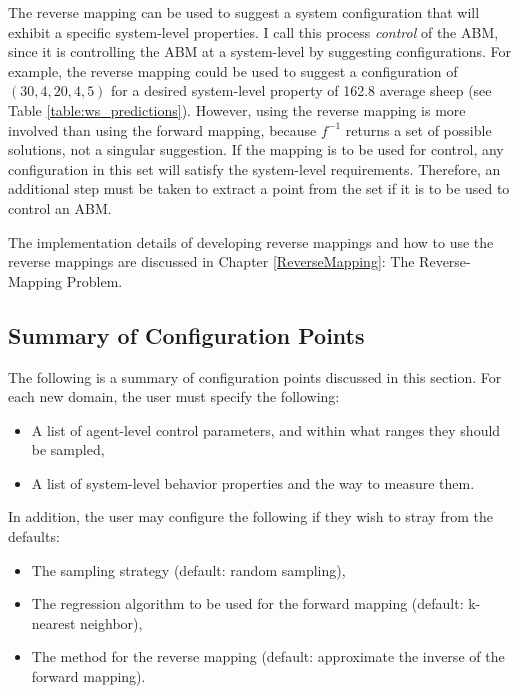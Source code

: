 The reverse mapping can be used to suggest a system configuration that will exhibit a specific system-level properties.
I call this process \textit{control} of the ABM, since it is controlling the ABM at a system-level by suggesting configurations.
For example, the reverse mapping could be used to suggest a configuration of $(30, 4, 20, 4, 5)$  for a desired system-level property of 162.8 average sheep (see Table \ref{table:ws_predictions}).
However, using the reverse mapping is more involved than using the forward mapping, because $f^{-1}$ returns a set of possible solutions, not a singular suggestion.
If the mapping is to be used for control, any configuration in this set will satisfy the system-level requirements.
Therefore, an additional step must be taken to extract a point from the set if it is to be used to control an ABM.

The implementation details of developing reverse mappings and how to use the reverse mappings are discussed in Chapter \ref{ReverseMapping}: The Reverse-Mapping Problem.





\subsection{Summary of Configuration Points}

The following is a summary of configuration points discussed in this section.
For each new domain, the user must specify the following:
\begin{itemize}
   \item A list of agent-level control parameters, and within what ranges they should be sampled,
   \item A list of system-level behavior properties and the way to measure them.
\end{itemize}

In addition, the user may configure the following if they wish to stray from the defaults:
\begin{itemize}
   \item The sampling strategy (default: random sampling),
   \item The regression algorithm to be used for the forward mapping (default: k-nearest neighbor),
   \item The method for the reverse mapping (default: approximate the inverse of the forward mapping).
\end{itemize}


